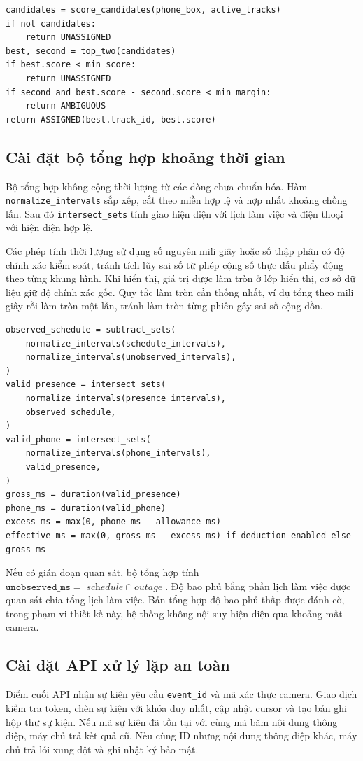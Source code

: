 \begin{Verbatim}[fontsize=\small,breaklines=true]
candidates = score_candidates(phone_box, active_tracks)
if not candidates:
    return UNASSIGNED
best, second = top_two(candidates)
if best.score < min_score:
    return UNASSIGNED
if second and best.score - second.score < min_margin:
    return AMBIGUOUS
return ASSIGNED(best.track_id, best.score)
\end{Verbatim}

\subsection{Cài đặt bộ tổng hợp khoảng thời gian}
Bộ tổng hợp không cộng thời lượng từ các dòng chưa chuẩn hóa. Hàm \texttt{normalize\_intervals} sắp xếp, cắt theo miền hợp lệ và hợp nhất khoảng chồng lấn. Sau đó \texttt{intersect\_sets} tính giao hiện diện với lịch làm việc và điện thoại với hiện diện hợp lệ.

Các phép tính thời lượng sử dụng số nguyên mili giây hoặc số thập phân có độ chính xác kiểm soát, tránh tích lũy sai số từ phép cộng số thực dấu phẩy động theo từng khung hình. Khi hiển thị, giá trị được làm tròn ở lớp hiển thị, cơ sở dữ liệu giữ độ chính xác gốc. Quy tắc làm tròn cần thống nhất, ví dụ tổng theo mili giây rồi làm tròn một lần, tránh làm tròn từng phiên gây sai số cộng dồn.

\begin{Verbatim}[fontsize=\small,breaklines=true]
observed_schedule = subtract_sets(
    normalize_intervals(schedule_intervals),
    normalize_intervals(unobserved_intervals),
)
valid_presence = intersect_sets(
    normalize_intervals(presence_intervals),
    observed_schedule,
)
valid_phone = intersect_sets(
    normalize_intervals(phone_intervals),
    valid_presence,
)
gross_ms = duration(valid_presence)
phone_ms = duration(valid_phone)
excess_ms = max(0, phone_ms - allowance_ms)
effective_ms = max(0, gross_ms - excess_ms) if deduction_enabled else gross_ms
\end{Verbatim}

Nếu có gián đoạn quan sát, bộ tổng hợp tính $\texttt{unobserved\_ms}=|\textit{schedule}\cap\textit{outage}|$. Độ bao phủ bằng phần lịch làm việc được quan sát chia tổng lịch làm việc. Bản tổng hợp độ bao phủ thấp được đánh cờ, trong phạm vi thiết kế này, hệ thống không nội suy hiện diện qua khoảng mất camera.

\subsection{Cài đặt API xử lý lặp an toàn}
Điểm cuối API nhận sự kiện yêu cầu \texttt{event\_id} và mã xác thực camera. Giao dịch kiểm tra token, chèn sự kiện với khóa duy nhất, cập nhật cursor và tạo bản ghi hộp thư sự kiện. Nếu mã sự kiện đã tồn tại với cùng mã băm nội dung thông điệp, máy chủ trả kết quả cũ. Nếu cùng ID nhưng nội dung thông điệp khác, máy chủ trả lỗi xung đột và ghi nhật ký bảo mật.

